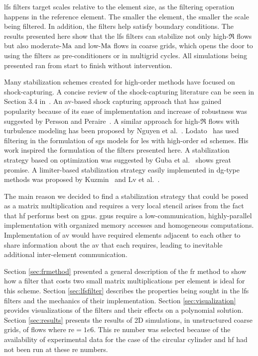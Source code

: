 \gls{lfs} filters target scales relative to the element size, as the filtering operation happens in the reference element. The smaller the element, the smaller the scale being filtered. In addition, the filters help satisfy boundary conditions. The  results presented here show that the \gls{lfs} filters can  stabilize not only high-$\Re$ flows but also moderate-$\mathrm{Ma}$ and low-$\mathrm{Ma}$ flows in coarse grids, which opens the door to using the filters as pre-conditioners or in multigrid cycles. All simulations being presented ran from start to finish without intervention.

Many stabilization schemes created for high-order methods have focused on shock-capturing. A concise review of the shock-capturing literature can be seen in Section 3.4 in~\cite{vincent2011facilitating}. An \gls{av}-based shock capturing approach that has gained popularity because of its ease of implementation and increase of robustness was suggested by Persson and Peraire~\cite{persson2006sub}. A similar approach for high-$\Re$ flows with turbulence modeling has been proposed by Nguyen et al.~\cite{nguyen2007rans}. Lodato~\cite{lodato2014structural} has used filtering in the formulation of \gls{sgs} models for \gls{les} with high-order \gls{sd} schemes. His work inspired the formulation of the filters presented here. A stabilization strategy based on optimization was suggested by Guba et al.~\cite{guba2014optimization} shows great promise. A limiter-based stabilization strategy easily implemented in \gls{dg}-type methods was proposed by Kuzmin~\cite{kuzmin2004high} and Lv et al.~\cite{lv2015entropy}.

The main reason we decided to find a stabilization strategy that could be posed as a matrix multiplication and requires a very local stencil arises from the fact that \gls{hf} performs best on \gls{gpu}s. \gls{gpu}s require a low-communication, highly-parallel implementation with organized memory accesses and homogeneous computations. Implementation of \gls{av} would have required elements adjacent to each other to share information about the \gls{av} that each requires, leading to inevitable additional inter-element communication.

 Section \ref{sec:frmethod} presented a general description of the \gls{fr} method to show how a filter that costs two small matrix multiplications per element is ideal for this scheme. Section \ref{sec:lfsfilter} describes the properties being sought in the \gls{lfs} filters and the mechanics of their implementation. Section \ref{sec:visualization} provides visualizations of the filters and their effects on a polynomial solution. Section \ref{sec:results} presents the results of 2D simulations, in unstructured coarse grids, of flows where \gls{re}$= 1e6$. This \gls{re} number was selected because of the availability of experimental data for the case of the circular cylinder and \gls{hf} had not been run at these \gls{re} numbers.


